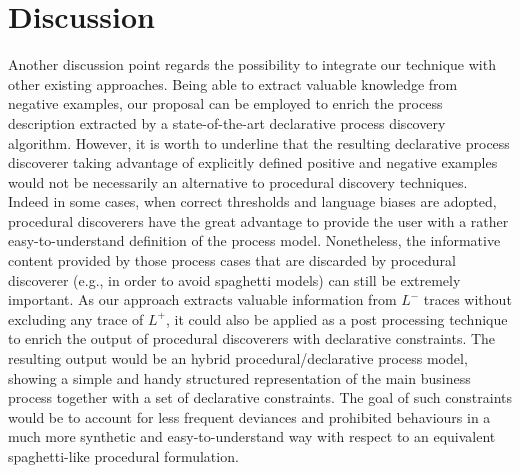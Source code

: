 
\section{Discussion}
\label{sec:discuss}


Another discussion point regards the possibility to integrate our technique with other existing approaches. Being able to extract valuable knowledge from negative examples, our proposal can be employed to enrich the process description extracted by a state-of-the-art declarative process discovery algorithm.
However, it is worth to underline that the resulting declarative process discoverer taking advantage of explicitly defined positive and negative examples would not be necessarily an alternative to procedural discovery techniques. 
Indeed in some cases, when correct thresholds and language biases are adopted, procedural discoverers have the great advantage to provide the user with a rather easy-to-understand definition of the process model. Nonetheless, the informative content provided by those process cases that are discarded by procedural discoverer (e.g., in order to avoid spaghetti models) can still be extremely important. 
As our approach extracts valuable information from $L^-$ traces without excluding any trace of $L^+$, it could also be applied as a post processing technique to enrich the output of procedural discoverers with declarative constraints.
The resulting output would be an hybrid procedural/declarative process model, showing a simple and handy structured representation of the main business process together with a set of declarative constraints. The goal of such constraints would be to account for less frequent deviances and prohibited behaviours in a much more synthetic and easy-to-understand way with respect to an equivalent spaghetti-like procedural formulation.

